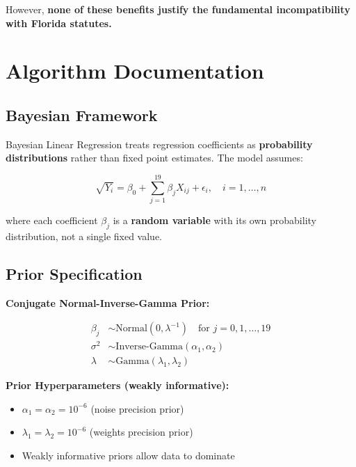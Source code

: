 However, \textbf{none of these benefits justify the fundamental incompatibility with Florida statutes.}


\section{Algorithm Documentation}

\subsection{Bayesian Framework}

Bayesian Linear Regression treats regression coefficients as \textbf{probability distributions} rather than fixed point estimates. The model assumes:

\begin{equation}
\sqrt{Y_i} = \beta_0 + \sum_{j=1}^{19} \beta_j X_{ij} + \epsilon_i, \quad i = 1, \ldots, n
\end{equation}

where each coefficient $\beta_j$ is a \textbf{random variable} with its own probability distribution, not a single fixed value.

\subsection{Prior Specification}

\textbf{Conjugate Normal-Inverse-Gamma Prior:}

\begin{align}
\beta_j &\sim \text{Normal}(0, \lambda^{-1}) \quad \text{for } j = 0, 1, \ldots, 19 \\
\sigma^2 &\sim \text{Inverse-Gamma}(\alpha_1, \alpha_2) \\
\lambda &\sim \text{Gamma}(\lambda_1, \lambda_2)
\end{align}

\textbf{Prior Hyperparameters (weakly informative):}
\begin{itemize}
    \item $\alpha_1 = \alpha_2 = 10^{-6}$ (noise precision prior)
    \item $\lambda_1 = \lambda_2 = 10^{-6}$ (weights precision prior)
    \item Weakly informative priors allow data to dominate
\end{itemize}

